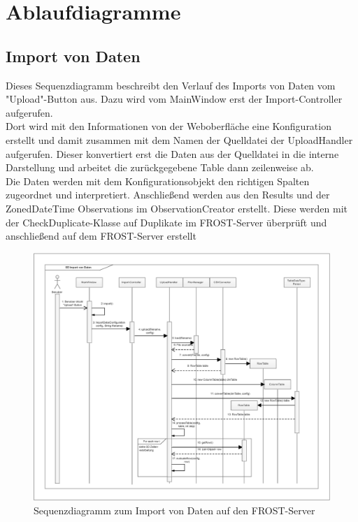 \section{Ablaufdiagramme}

\subsection{Import von Daten}

Dieses Sequenzdiagramm beschreibt den Verlauf des Imports von Daten vom "{Upload}"{-Button} aus.
Dazu wird vom MainWindow erst der Import-Controller aufgerufen.\\
Dort wird mit den Informationen von der Weboberfläche eine Konfiguration erstellt und damit zusammen mit dem Namen der Quelldatei der UploadHandler aufgerufen.
Dieser konvertiert erst die Daten aus der Quelldatei in die interne Darstellung und arbeitet die zurückgegebene Table dann zeilenweise ab.
\\
Die Daten werden mit dem Konfigurationsobjekt den richtigen Spalten zugeordnet und interpretiert.
Anschließend werden aus den Results und der ZonedDateTime Observations im ObservationCreator erstellt.
Diese werden mit der CheckDuplicate-Klasse auf Duplikate im FROST-Server überprüft und anschließend auf dem FROST-Server erstellt
\begin{figure}[htbp]
\centering
\includegraphics[scale=0.4]{uml/SD_upload.eps}
\caption{Sequenzdiagramm zum Import von Daten auf den FROST-Server}
\end{figure}

